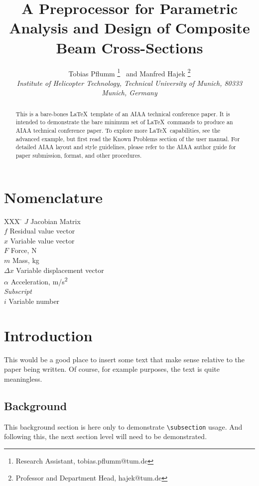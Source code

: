 \documentclass[]{aiaa-tc}%
\title{A Preprocessor for Parametric Analysis and Design of Composite Beam Cross-Sections}
\author{
  Tobias Pflumm%
    \thanks{Research Assistant, tobias.pflumm@tum.de}
  \ and Manfred Hajek \thanks{Professor and Department Head, hajek@tum.de}\\
  {\normalsize\itshape
  Institute of Helicopter Technology,  Technical University of Munich, 80333 Munich, Germany}\\
 }
\begin{document}
\maketitle

\begin{abstract}
This is a bare-bones \LaTeX\ template of an AIAA technical conference paper.
It is intended to demonstrate the bare minimum set of \LaTeX\ commands
to produce an AIAA technical conference paper.
To explore more \LaTeX\ capabilities, see the advanced example, but
first read the Known Problems section of the user manual.
For detailed AIAA layout and style guidelines, please refer to the AIAA
author guide for paper submission, format, and other procedures.
\end{abstract}

\section*{Nomenclature}

\begin{tabbing}
  XXX \= \kill%
  $J$ \> Jacobian Matrix \\
  $f$ \> Residual value vector \\
  $x$ \> Variable value vector \\
  $F$ \> Force, N \\
  $m$ \> Mass, kg \\
  $\Delta x$ \> Variable displacement vector \\
  $\alpha$ \> Acceleration, m/s\textsuperscript{2} \\[5pt]
  \textit{Subscript}\\
  $i$ \> Variable number \\
 \end{tabbing}

\section{Introduction}

This would be a good place to insert some text that make sense relative
to the paper being written.
Of course, for example purposes, the text is quite meaningless.

\subsection{Background}

This background section is here only to demonstrate \verb|\subsection|
usage.
And following this, the next section level will need to be demonstrated.
\end{document}
